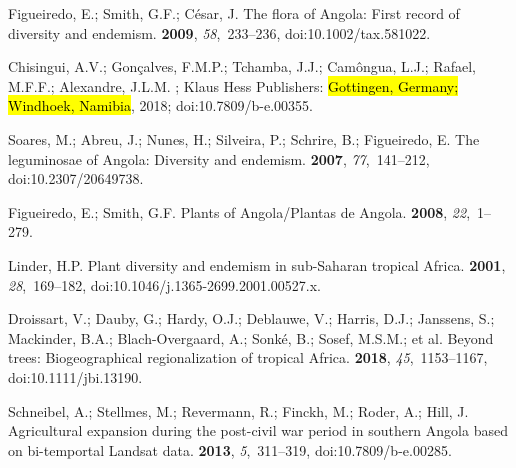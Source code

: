 \documentclass[diversity,article,accept,moreauthors,pdftex]{Definitions/mdpi}
\begin{document}
\begin{thebibliography}{999}

Figueiredo, E.; Smith, G.F.; C{\'e}sar, J.
\newblock The flora of {Angola}: {First} record of diversity and endemism.
 {\bf 2009}, {\em 58},~233--236, doi:10.1002/tax.581022.

Chisingui, A.V.; Gon\c{c}alves, F.M.P.; Tchamba, J.J.; Cam{\^o}ngua, L.J.;
  Rafael, M.F.F.; Alexandre, J.L.M.
; Klaus Hess Publishers: \hl{Gottingen, Germany; Windhoek, Namibia},  2018; doi:10.7809/b-e.00355. %

Soares, M.; Abreu, J.; Nunes, H.; Silveira, P.; Schrire, B.; Figueiredo, E.
\newblock The leguminosae of {Angola}: {Diversity} and endemism.
 {\bf 2007}, {\em
  77},~141--212, doi:10.2307/20649738.

Figueiredo, E.; Smith, G.F.
\newblock Plants of {Angola}/{Plantas} de {Angola}.
 {\bf 2008}, {\em 22},~1--279.

Linder, H.P.
\newblock Plant diversity and endemism in {sub-Saharan} tropical {Africa}.
 {\bf 2001}, {\em 28},~169--182, doi:10.1046/j.1365-2699.2001.00527.x.

Droissart, V.; Dauby, G.; Hardy, O.J.; Deblauwe, V.; Harris, D.J.; Janssens,
  S.; Mackinder, B.A.; {Blach-Overgaard}, A.; Sonk{\'e}, B.; Sosef, M.S.M.;
 et al.
\newblock Beyond trees: {Biogeographical} regionalization of tropical {Africa}.
 {\bf 2018}, {\em 45},~1153--1167, doi:10.1111/jbi.13190.

Schneibel, A.; Stellmes, M.; Revermann, R.; Finckh, M.; R{\:o}der, A.; Hill, J.
\newblock Agricultural expansion during the post-civil war period in southern
  Angola based on bi-temportal {Landsat} data.
 {\bf 2013}, {\em 5},~311--319, doi:10.7809/b-e.00285.


\end{thebibliography}
\end{document}
